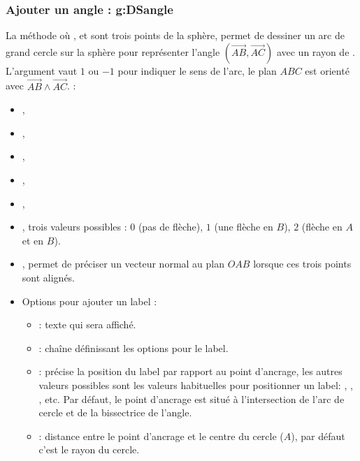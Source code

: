 \subsubsection{Ajouter un angle : g:DSangle}

La méthode  où ,  et  sont trois points de la sphère, permet de dessiner un arc de grand cercle sur la sphère pour représenter l'angle $(\vec{AB},\vec{AC})$ avec un rayon de . L'argument  vaut $1$ ou $-1$ pour indiquer le sens de l'arc, le plan $ABC$ est orienté avec $\vec{AB}\wedge\vec{AC}$. \writeoptions :
    \begin{itemize}
        \item {}, 
        \item {},
        \item {},
        \item {},
        \item {},
        \item {}, trois valeurs possibles : $0$ (pas de flèche), $1$ (une flèche en $B$), $2$ (flèche en $A$ et en $B$).
        \item {}, permet de préciser un vecteur normal au plan $OAB$ lorsque ces trois points sont alignés.
        \item Options pour ajouter un label :
        \begin{itemize} 
            \item {} : texte qui sera affiché.
            
            \item {} : chaîne définissant les options pour le label.
            
            \item {} : précise la position du label par rapport au point d'ancrage, les autres valeurs possibles sont les valeurs habituelles pour positionner un label: , , , etc. Par défaut, le point d'ancrage est situé à l'intersection de l'arc de cercle et de la bissectrice de l'angle.
            
            \item {} : distance entre le point d'ancrage et le centre du cercle ($A$), par défaut c'est le rayon  du cercle.
            

\end{itemize}
\end{itemize}
